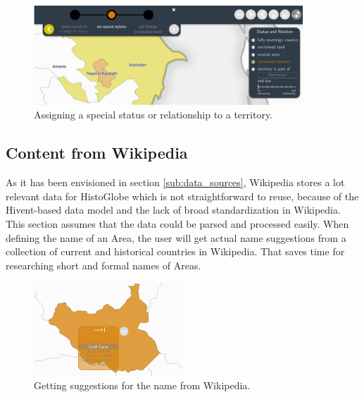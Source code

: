 \begin{figure}[ht]
  \centering
  \includegraphics[width = 0.9\textwidth]{graphics/extensions/new_status_tool}
  \caption{Assigning a special status or relationship to a territory.}
  \label{fig:uncertainty_new_status_tool}
\end{figure}



\newpage
\subsection{Content from Wikipedia} %
\label{sub:content_from_wikipedia}

As it has been envisioned in section \ref{sub:data_sources}, Wikipedia stores a lot relevant data for HistoGlobe which is not straightforward to reuse, because of the Hivent-based data model and the lack of broad standardization in Wikipedia. This section assumes that the data could be parsed and processed easily. When defining the name of an Area, the user will get actual name suggestions from a collection of current and historical countries in Wikipedia. That saves time for researching short and formal names of Areas.

\begin{figure}[H]
  \centering
  \includegraphics[width=0.5\textwidth]{graphics/extensions/new_name_tool}
  \caption{Getting suggestions for the name from Wikipedia.}
  \label{fig:uncertainty_new_name_tool}
\end{figure}

